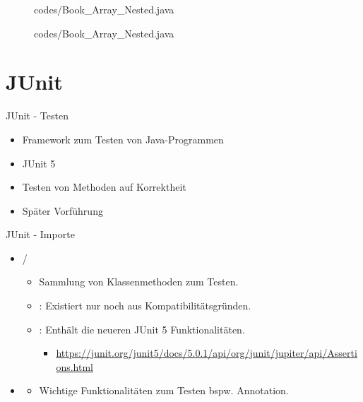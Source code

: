 \documentclass{../tuda-beamer}
\begin{document}
    \begin{frame}[c]
        \begin{figure}[h]
            \centering
            
            {codes/Book_Array_Nested.java}
        \end{figure}
    \end{frame}

    \begin{frame}[c]
        \begin{figure}[h]
            \centering
            
            {codes/Book_Array_Nested.java}
        \end{figure}
    \end{frame}


    \section{JUnit}
    \begin{frame}{JUnit - Testen}
        \begin{itemize}
            \item Framework zum Testen von Java-Programmen
            \item JUnit 5
            \item Testen von Methoden auf Korrektheit
            \item Später Vorführung
        \end{itemize}
    \end{frame}

    \begin{frame}{JUnit - Importe}
        \begin{itemize}
            \item {}/ 
            \begin{itemize}
                \item Sammlung von Klassenmethoden zum Testen.
                \item {}: Existiert nur noch aus Kompatibilitätsgründen.
                \item {}: Enthält die neueren JUnit 5 Funktionalitäten.
                \begin{itemize}
                    \item \url{https://junit.org/junit5/docs/5.0.1/api/org/junit/jupiter/api/Assertions.html}
                \end{itemize}
            \end{itemize}
            \item {}
            \begin{itemize}
                \item Wichtige Funktionalitäten zum Testen bspw.  Annotation.
            \end{itemize}
        \end{itemize}
    \end{frame}
\end{document}
